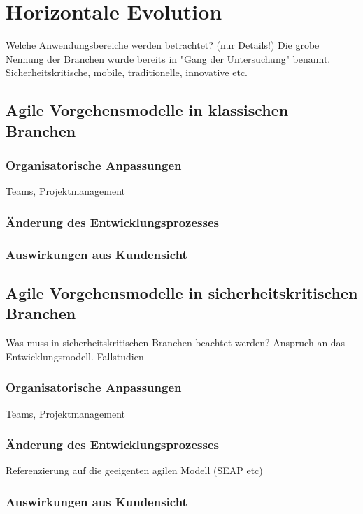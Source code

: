 \chapter{Horizontale Evolution} %

Welche Anwendungsbereiche werden betrachtet? (nur Details!)
Die grobe Nennung der Branchen wurde bereits in "Gang der Untersuchung" benannt.
Sicherheitskritische, mobile, traditionelle, innovative etc.

\section{Agile Vorgehensmodelle in klassischen Branchen}

\subsection{Organisatorische Anpassungen}

Teams, Projektmanagement

\subsection{Änderung des Entwicklungsprozesses}

\subsection{Auswirkungen aus Kundensicht}


\section{Agile Vorgehensmodelle in sicherheitskritischen Branchen}

Was muss in sicherheitskritischen Branchen beachtet werden?
Anspruch an das Entwicklungsmodell.
Fallstudien

\subsection{Organisatorische Anpassungen}

Teams, Projektmanagement

\subsection{Änderung des Entwicklungsprozesses}

Referenzierung auf die geeigenten agilen Modell (SEAP etc)

\subsection{Auswirkungen aus Kundensicht}




